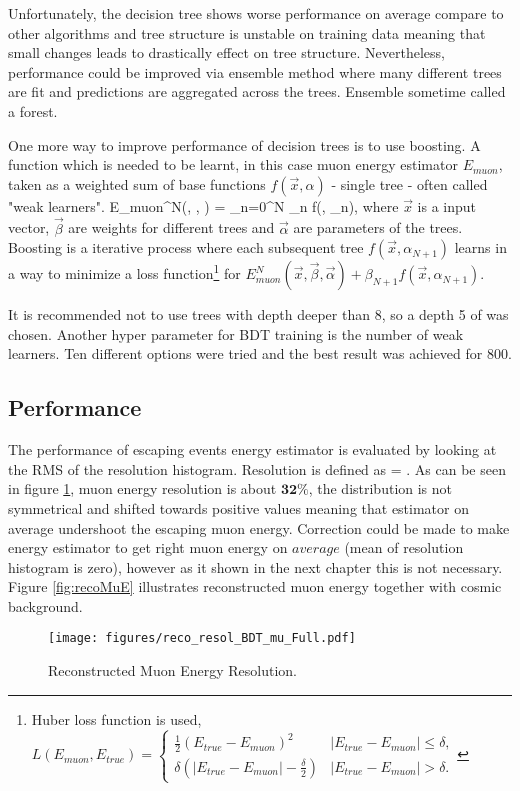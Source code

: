 Unfortunately, the decision tree shows worse performance on average compare to other algorithms 
and tree structure is unstable on training data meaning that small changes leads to drastically 
effect on tree structure. Nevertheless, performance could be improved via ensemble method 
where many different trees are fit and predictions are aggregated across the trees. Ensemble 
sometime called a forest.

One more way to improve performance of decision trees is to use boosting. A function which is 
needed to be learnt, in this case muon energy estimator $E_{muon}$, taken as a weighted sum of 
base functions $f(\vec{x}, \alpha)$ - single tree - often called "weak learners". 
\be
E_{muon}^N(, \vec{\beta}, \vec{\alpha}) = \sum_{n=0}^N \beta_n f(, \alpha_n),
\ee
where $\vec{x}$ is a input vector, $\vec{\beta}$ are weights for different trees and $\vec{\alpha}$
are parameters of the trees. Boosting is a iterative process where each subsequent tree 
$f(\vec{x}, \alpha_{N+1})$ learns in a way to minimize a loss function\footnote{Huber loss function
is used,
$
L(E_{muon}, E_{true}) = \begin{cases}
				\frac{1}{2}(E_{true} - E_{muon})^2 & |E_{true} - E_{muon}| \leq \delta, \\
				\delta(|E_{true} - E_{muon}| - \frac{\delta}{2}) & |E_{true} - E_{muon}| > \delta.
			\end{cases}
$} for $E_{muon}^N(\vec{x}, \vec{\beta}, \vec{\alpha}) + \beta_{N+1}f(\vec{x}, \alpha_{N+1})$.

It is recommended not to use trees with depth deeper than 8, so a depth 5 of was chosen. Another 
hyper parameter for BDT training is the number of weak learners. Ten different options were tried
and the best result was achieved for 800.

\subsection{Performance}
The performance of escaping events energy estimator is evaluated by looking at the RMS of the 
resolution histogram. Resolution is defined as 
\be
{} = .
\ee
As can be seen in figure \ref{fig:recoMuE_resol}, muon energy resolution is about $\textbf{32\%}$, the 
distribution is not symmetrical and shifted towards positive values meaning that estimator on average 
undershoot the escaping muon energy. Correction could be made to make energy estimator to get right
muon energy on $\textit{average}$ (mean of resolution histogram is zero), however as it shown in the 
next chapter this is not necessary. Figure \ref{fig:recoMuE} illustrates reconstructed muon energy together 
with cosmic background. 
\begin{figure}[!th]
\centering
\texttt{[image: figures/reco\_resol\_BDT\_mu\_Full.pdf]}
\caption{Reconstructed Muon Energy Resolution.}
\label{fig:recoMuE_resol}
\end{figure}

